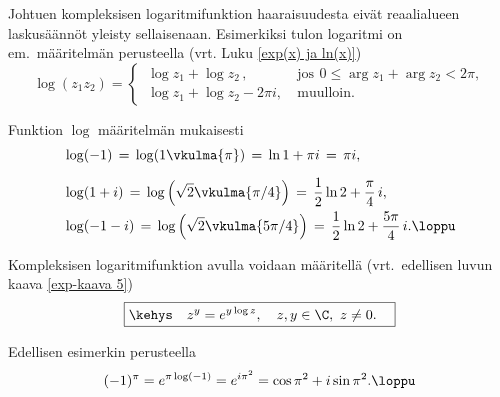 Johtuen kompleksisen logaritmifunktion haaraisuudesta eivät reaalialueen laskusäännöt yleisty
sellaisenaan. Esimerkiksi tulon logaritmi on em.\ määritelmän perusteella
(vrt. Luku \ref{exp(x) ja ln(x)})
\[
\log (z_1z_2)=\begin{cases}
\,\log z_1+\log z_2\,,           &\text{jos}\,\ 0\leq\arg z_1+\arg z_2<2\pi, \\
\,\log z_1+\log z_2 -2\pi i,\  &\text{muulloin}.
\end{cases}
\]
\begin{Exa} Funktion $\log$ määritelmän mukaisesti
\begin{align*}
&\log(-1)    \,=\, \log(1\vkulma{\pi})           
             \,=\, \ln 1 + \pi i \,=\, \pi i, \\[2mm]
&\log (1+i)  \,=\, \log\left(\sqrt{2}\vkulma{\pi/4}\right)  
             \,=\, \frac{1}{2}\ln 2+\frac{\pi}{4}\,i, \\
&\log (-1-i) \,=\, \log\left(\sqrt{2}\vkulma{5\pi/4}\right) 
             \,=\, \frac{1}{2}\ln 2+\frac{5\pi}{4}\,i.\loppu
\end{align*}
\end{Exa}
Kompleksisen logaritmifunktion avulla voidaan määritellä (vrt.\ edellisen luvun kaava
\eqref{exp-kaava 5})
\[
\boxed{\kehys\quad z^y = e^{y\log z}, \quad z,y\in\C,\ z\neq 0. \quad}
\]
\begin{Exa} Edellisen esimerkin perusteella
\[
(-1)^\pi=e^{\pi\log(-1)}=e^{i\pi^2}=\cos\pi^2+i\sin\pi^2. \loppu
\]
\end{Exa}

